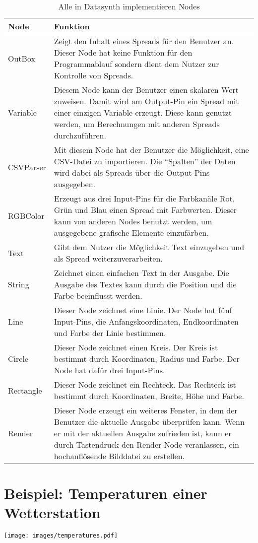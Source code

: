 \documentclass[a4paper, 
               12pt,
               DIV=calc,
               version=first,
               pdftex,
               headsepline,
               footsepline,
               bibtotocnumbered,
               liststotocnumbered]{scrreprt}
\begin{document}
\begin{table}
\centering
\begin{tabular}{|l|p{10cm}|}
\hline
\textbf{Node} & \textbf{Funktion}\\
\hline
OutBox & Zeigt den Inhalt eines Spreads für den Benutzer an. Dieser Node hat keine Funktion für den Programmablauf sondern
dient dem Nutzer zur Kontrolle von Spreads.\\
\hline
Variable & Diesem Node kann der Benutzer einen skalaren Wert zuweisen. Damit wird am Output-Pin ein Spread mit einer einzigen
Variable erzeugt. Diese kann genutzt werden, um Berechnungen mit anderen Spreads durchzuführen.\\
\hline
CSVParser & Mit diesem Node hat der Benutzer die Möglichkeit, eine CSV-Datei zu importieren.
Die "`Spalten"' der Daten wird dabei als Spreads über die Output-Pins ausgegeben.\\
\hline
RGBColor & Erzeugt aus drei Input-Pins für die Farbkanäle Rot, Grün und Blau einen Spread mit Farbwerten. Dieser
kann von anderen Nodes benutzt werden, um ausgegebene grafische Elemente einzufärben.\\
\hline
Text & Gibt dem Nutzer die Möglichkeit Text einzugeben und als Spread weiterzuverarbeiten.\\
\hline
String & Zeichnet einen einfachen Text in der Ausgabe. Die Ausgabe des Textes kann durch die Position und die Farbe beeinflusst werden.\\
\hline
Line & Dieser Node zeichnet eine Linie. Der Node hat fünf Input-Pins, die Anfangskoordinaten, Endkoordinaten und Farbe
der Linie bestimmen.\\
\hline
Circle & Dieser Node zeichnet einen Kreis. Der Kreis ist bestimmt durch Koordinaten, Radius und Farbe. Der Node
hat dafür drei Input-Pins.\\
\hline
Rectangle & Dieser Node zeichnet ein Rechteck. Das Rechteck ist bestimmt durch Koordinaten, Breite, Höhe und Farbe.\\
\hline
Render & Dieser Node erzeugt ein weiteres Fenster, in dem der Benutzer die aktuelle Ausgabe überprüfen kann.
Wenn er mit der aktuellen Ausgabe zufrieden ist, kann er durch Tastendruck den Render-Node veranlassen, ein
hochauflösende Bilddatei zu erstellen.\\
\hline
\end{tabular}
\caption{Alle in Datasynth implementieren Nodes}
\label{tab:alleNodes}
\end{table}


\section{Beispiel: Temperaturen einer Wetterstation}
\label{sec:temperatures}
\centering
\texttt{[image: images/temperatures.pdf]}
\end{document}
